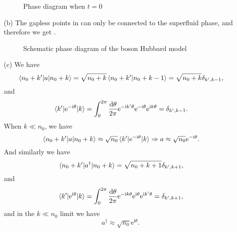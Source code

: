 \documentclass[hyperref, a4paper]{article}
\newcommand*{\ii}{\mathrm{i}}
\newcommand*{\ee}{\mathrm{e}}
\begin{document}
\begin{itemize}
\begin{figure}
    \centering
    
    \caption{Phase diagram when $t = 0$}
    \label{fig:mott-phase}
\end{figure}

\item[(b)] The gapless points in  can only be connected to the superfluid phase,
and therefore we get .

\begin{figure}
    \centering
    
    \caption{Schematic phase diagram of the boson Hubbard model}
    \label{fig:boson-hubbard}
\end{figure}

\item[(c)] We have 
\begin{equation}
    \mel{n_0 + k'}{a}{n_0 + k} = \sqrt{n_0 + k} \braket{n_0 + k'}{n_0 + k - 1} 
    = \sqrt{n_0 + k} \delta_{k', k-1},
\end{equation}
and 
\begin{equation}
    \mel{k'}{\ee^{- \ii \theta}}{k} 
    = \int_{0}^{2\pi} \frac{\dd{\theta}}{2\pi} \ee^{- \ii k' \theta} \ee^{- \ii \theta} \ee^{\ii k \theta}
    = \delta_{k', k - 1}.
\end{equation}
When $k \ll n_0$, we have 
\begin{equation}
    \mel{n_0 + k'}{a}{n_0 + k} \approx \sqrt{n_0} \mel{k'}{\ee^{- \ii \theta}}{k} \Rightarrow
    a \approx \sqrt{n_0} \ee^{- \ii \theta}.
\end{equation}
And similarly we have 
\begin{equation}
    \mel{n_0 + k'}{a^\dagger}{n_0 + k} = \sqrt{n_0 + k + 1} \delta_{k', k+1},
\end{equation}
and 
\begin{equation}
    \mel{k'}{\ee^{\ii \theta}}{k} 
    = \int_0^{2\pi} \frac{\dd{\theta}}{2\pi} \ee^{- \ii k \theta} \ee^{\ii \theta} \ee^{\ii k' \theta}
    = \delta_{k', k+1},
\end{equation}
and in the $k \ll n_0$ limit we have 
\begin{equation}
    a^{\dagger} \approx \sqrt{n_0} \ee^{\ii \theta}.
\end{equation}


\end{itemize}
\end{document}
